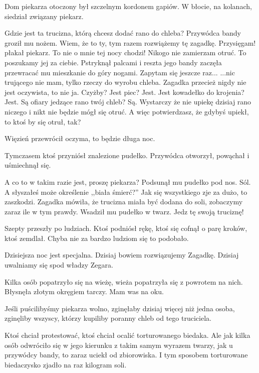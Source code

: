 Dom piekarza otoczony był szczelnym kordonem gapiów.
W błocie, na kolanach, siedział związany piekarz.
\begin{dialogue}
	\ds{} Gdzie jest ta trucizna, którą chcesz dodać rano do chleba? \dm{} Przywódca bandy groził mu nożem. \dm{} Wiem, że to ty, tym razem rozwiążemy tę zagadkę.
	\ds{} Przysięgam! \dm{} płakał piekarz. \dm{} To nie o mnie tej nocy chodzi! Nikogo nie zamierzam otruć.
	\ds{} To poszukamy jej za ciebie. \dm{} Pstryknął palcami i reszta jego bandy zaczęła przewracać mu mieszkanie do góry nogami. \ds{} Zapytam się jeszcze raz...
	\ds{} ...nic trującego nie mam, tylko rzeczy do wyrobu chleba. Zagadka przecież nigdy nie jest oczywista, to nie ja.
	\ds{} Czyżby? Jest piec? Jest. Jest kowadełko do krojenia? Jest. Są ofiary jedzące rano twój chleb? Są.
	\ds{} Wystarczy że nie upiekę dzisiaj rano niczego i nikt nie będzie mógł się otruć.
	\ds{} A więc potwierdzasz, że gdybyś upiekł, to ktoś by się otruł, tak?
\end{dialogue}
Więzień przewrócił oczyma, to będzie długa noc.

Tymczasem ktoś przyniósł znalezione pudełko.
Przywódca otworzył, powąchał i uśmiechnął się.

\begin{dialogue}
	\ds{} A co to w takim razie jest, proszę piekarza? \dm{} Podsunął mu pudełko pod nos.
	\ds{} Sól.
	\ds{} A słyszałeś może określenie ,,biała śmierć?''
	\ds{} Jak się wszystkiego zje za dużo, to zaszkodzi.
	\ds{} Zagadka mówiła, że trucizna miała być dodana do soli, zobaczymy zaraz ile w tym prawdy. \dm{} Wsadził mu pudełko w twarz. \dm{} Jedz tę swoją truciznę!
\end{dialogue}

Szepty przeszły po ludziach.
Ktoś podniósł rękę, ktoś się cofnął o parę kroków, ktoś zemdlał.
Chyba nie za bardzo ludziom się to podobało.
\begin{dialogue}
	\ds{} Dzisiejsza noc jest specjalna. Dzisiaj bowiem rozwiązujemy Zagadkę. Dzisiaj uwalniamy się spod władzy Zegara.
\end{dialogue}
Kilka osób popatrzyło się na wieżę, wieża popatrzyła się z powrotem na nich. Błysnęła złotym okręgiem tarczy. Mam was na oku.
\begin{dialogue}
	\ds{} Jeśli puścilibyśmy piekarza wolno, zginęłaby dzisiaj więcej niż jedna osoba, zginęliby wszyscy, którzy kupiliby poranny chleb od tego truciciela.
\end{dialogue}
Ktoś chciał protestować, ktoś chciał ocalić torturowanego biedaka.
Ale jak kilka osób odwróciło się w jego kierunku z takim samym wyrazem twarzy, jak u przywódcy bandy, to zaraz uciekł od zbiorowiska.
I tym sposobem torturowane biedaczysko zjadło na raz kilogram soli.

